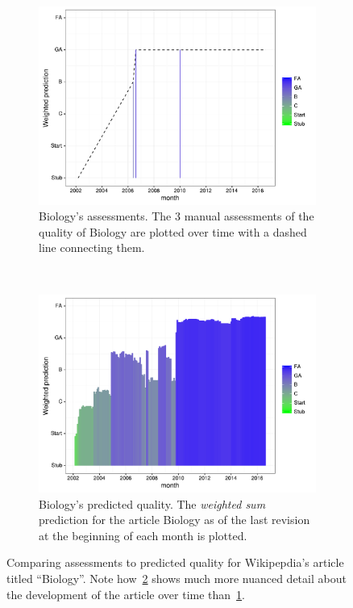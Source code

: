 \begin{figure}[p]
\centering
\begin{subfigure}[t]{.95\columnwidth}
  \centering
  \includegraphics[width=.90\columnwidth]{figures/biology_monthly_assessments}
  \caption{Biology's assessments.  The 3 manual assessments of the quality of Biology are plotted over time with a dashed line connecting them.}
  \label{fig:empirical_biology}
\end{subfigure}~~
\begin{subfigure}[t]{.95\columnwidth}
  \centering
  \includegraphics[width=.90\columnwidth]{figures/biology_monthly_wp10}
  \caption{Biology's predicted quality.  The \emph{weighted sum} prediction for the article Biology as of the last revision at the beginning of each month is plotted.}
  \label{fig:predicted_biology}
\end{subfigure}
\caption{Comparing assessments to predicted quality for Wikipepdia's article titled ``Biology''.  Note how~\ref{fig:predicted_biology} shows much more nuanced detail about the development of the article over time than~\ref{fig:empirical_biology}.}
\label{fig:empirical_and_predicted_biology}
\end{figure}
